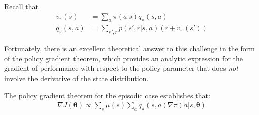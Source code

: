{\begin{tcolorbox}
Recall that
\begin{align*}
    v_\pi(s)&=\sum_a \pi(a|s)q_\pi(s,a)\\
    q_\pi(s, a)&=\sum_{s', r} p(s', r|s,a)(r+v_\pi(s'))
\end{align*}
\end{tcolorbox}
Fortunately, there is an excellent theoretical answer to this challenge in the form of the policy gradient theorem, which provides an analytic expression for the gradient of performance with respect to the policy parameter that does \textit{not} involve the derivative of the state distribution.

The policy gradient theorem for the episodic case establishes that:
\begin{align}
    \nabla J(\bm{\theta})\propto\sum_{s}\mu(s)\sum_a q_\pi(s,a)\nabla\pi(a|s, \bm{\theta})
\end{align}

}
